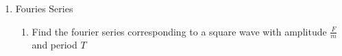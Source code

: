 \documentclass{article}
\begin{document}
\begin{enumerate}

    \item Fouries Series
    \begin{enumerate}
        \item Find the fourier series corresponding to a square wave with amplitude $\frac{F}{m}$ and period $T$\\


\end{enumerate}
\end{enumerate}
\end{document}
